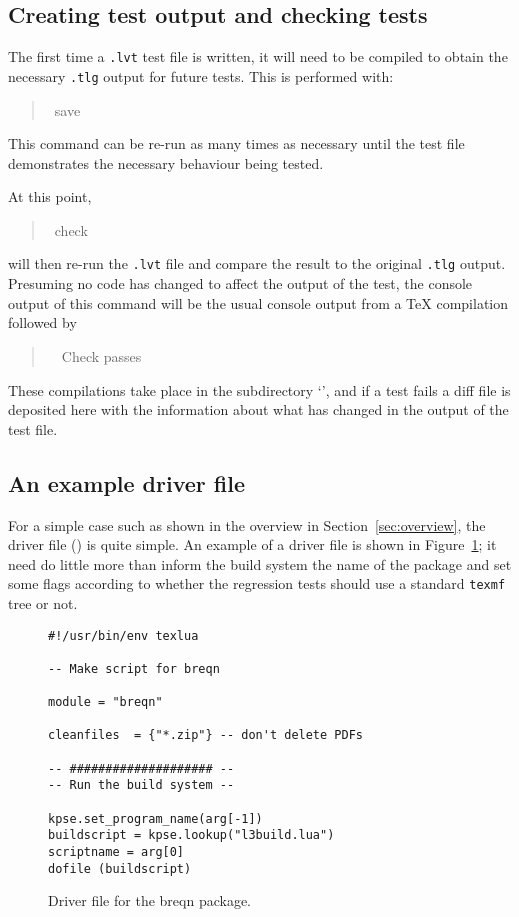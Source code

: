 \documentclass[a4paper]{ltugboat}
\begin{document}
\subsection{Creating test output and checking tests}

The first time a \texttt{.lvt} test file is written, it will need to be compiled to obtain the necessary \texttt{.tlg} output for future tests.
This is performed with:
\begin{quote}\ttfamily
\execname~save~
\end{quote}
This command can be re-run as many times as necessary until the test file demonstrates the necessary behaviour being tested.

At this point, 
\begin{quote}\ttfamily
\execname~check~
\end{quote}
will then re-run the \texttt{.lvt} file and compare the result to the original \texttt{.tlg} output.
Presuming no code has changed to affect the output of the test, the console output of this command will be the usual console output from a \TeX{} compilation followed by
\begin{quote}\ttfamily
~~Check passes
\end{quote}
These compilations take place in the subdirectory `\texttt{\compdirname}', and if a test fails a diff file is deposited here with the information about what has changed in the output of the test file.

\subsection{An example driver file}
\label{sec:example}

For a simple case such as shown in the overview in Section~\ref{sec:overview}, the driver file (\texttt{\drivername}) is quite simple.
An example of a driver file is shown in Figure~\ref{fig:driver}; it need do little more than inform the build system the name of the package and set some flags according to whether the regression tests should use a standard \texttt{texmf} tree or not.

\begin{figure}
\begin{Verbatim}[frame=single,fontsize=\small]
#!/usr/bin/env texlua

-- Make script for breqn

module = "breqn"

cleanfiles  = {"*.zip"} -- don't delete PDFs

-- #################### --
-- Run the build system --

kpse.set_program_name(arg[-1])
buildscript = kpse.lookup("l3build.lua")
scriptname = arg[0]
dofile (buildscript)
\end{Verbatim}
\caption{Driver file for the \textsf{breqn} package.}
\label{fig:driver}
\end{figure}
\end{document}
